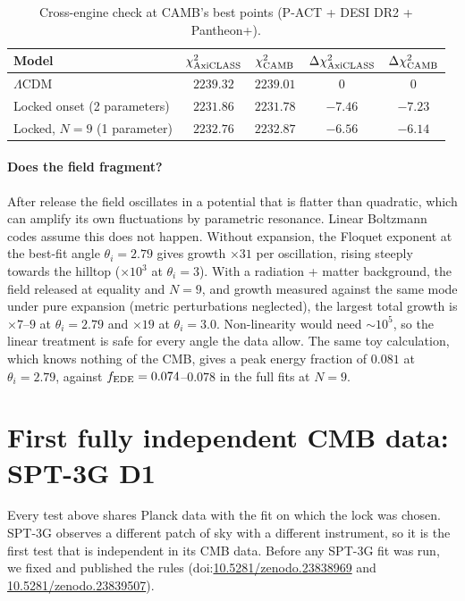 \documentclass[11pt]{article}
\begin{document}
\begin{table}[h]
\centering
\small
\begin{tabular}{lcccc}
\toprule
Model & $\chi^2_{\rm AxiCLASS}$ & $\chi^2_{\rm CAMB}$ & $\Delta\chi^2_{\rm AxiCLASS}$ & $\Delta\chi^2_{\rm CAMB}$\\
\midrule
$\Lambda$CDM & $2239.32$ & $2239.01$ & $0$ & $0$\\
Locked onset (2 parameters) & $2231.86$ & $2231.78$ & $-7.46$ & $-7.23$\\
Locked, $N=9$ (1 parameter) & $2232.76$ & $2232.87$ & $-6.56$ & $-6.14$\\
\bottomrule
\end{tabular}
\caption{Cross-engine check at CAMB's best points (P-ACT + DESI DR2 + Pantheon+).}
\label{tab:engines}
\end{table}

\paragraph{Does the field fragment?} After release the field oscillates in a potential that is
flatter than quadratic, which can amplify its own fluctuations by parametric resonance. Linear
Boltzmann codes assume this does not happen. Without expansion, the Floquet exponent at the best-fit
angle $\theta_i=2.79$ gives growth $\times31$ per oscillation, rising steeply towards the hilltop
($\times10^3$ at $\theta_i=3$). With a radiation + matter background, the field released at equality
and $N=9$, and growth measured against the same mode under pure expansion (metric perturbations
neglected), the largest total growth is $\times7$--$9$ at $\theta_i=2.79$ and $\times19$ at
$\theta_i=3.0$. Non-linearity would need $\sim10^5$, so the linear treatment is safe for every angle
the data allow. The same toy calculation, which knows nothing of the CMB, gives a peak energy fraction
of $0.081$ at $\theta_i=2.79$, against $f_{\rm EDE}=0.074$--$0.078$ in the full fits at $N=9$.

\section{First fully independent CMB data: SPT-3G D1}\label{sec:spt}
Every test above shares Planck data with the fit on which the lock was chosen. SPT-3G observes a
different patch of sky with a different instrument, so it is the first test that is independent in
its CMB data. Before any SPT-3G fit was run, we fixed and published the rules
(doi:\href{https://doi.org/10.5281/zenodo.23838969}{10.5281/zenodo.23838969} and
\href{https://doi.org/10.5281/zenodo.23839507}{10.5281/zenodo.23839507}).
\end{document}
